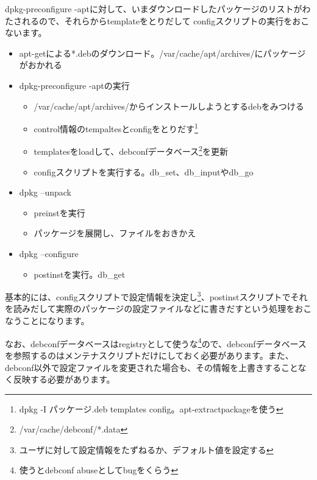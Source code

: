 \documentclass[mingoth,a4paper]{jsarticle}
\begin{document}
dpkg-preconfigure -aptに対して、いまダウンロードしたパッケージのリストがわたされるので、それらからtemplateをとりだして configスクリプトの実行をおこないます。

\begin{itemize}
\item apt-getによる*.debのダウンロード。/var/cache/apt/archives/にパッケージがおかれる
\item dpkg-preconfigure -aptの実行
 \begin{itemize}
   \item /var/cache/apt/archives/からインストールしようとするdebをみつける
   \item control情報のtempaltesとconfigをとりだす\footnote{dpkg -I パッケージ.deb templates config。apt-extractpackageを使う}
   \item templatesをloadして、debconfデータベース\footnote{/var/cache/debconf/*.data}を更新
   \item configスクリプトを実行する。db\_set、db\_inputやdb\_go
 \end{itemize}
\item dpkg --unpack
 \begin{itemize}
 \item preinstを実行
 \item パッケージを展開し、ファイルをおきかえ
 \end{itemize}
\item dpkg --configure
 \begin{itemize}
 \item postinstを実行。db\_get
 \end{itemize}
\end{itemize}

基本的には、configスクリプトで設定情報を決定し\footnote{ユーザに対して設定情報をたずねるか、デフォルト値を設定する}、postinstスクリプトでそれを読みだして実際のパッケージの設定ファイルなどに書きだすという処理をおこなうことになります。

なお、debconfデータベースはregistryとして使うな\footnote{使うとdebconf abuseとしてbugをくらう}ので、debconfデータベースを参照するのはメンテナスクリプトだけにしておく必要があります。また、debconf以外で設定ファイルを変更された場合も、その情報を上書きすることなく反映する必要があります。
\end{document}
